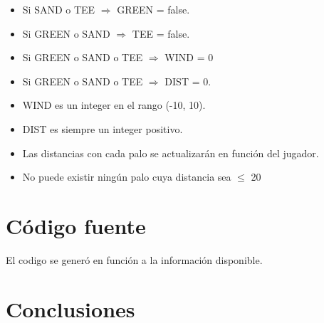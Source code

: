 \documentclass[runningheads,a4paper]{llncs}
\begin{document}
\begin{itemize}

	\item Si SAND o TEE $\Rightarrow$ GREEN = false.

	\item Si GREEN o SAND $\Rightarrow$ TEE = false.

	\item Si GREEN o SAND o TEE $\Rightarrow$ WIND = 0 

	\item Si GREEN o SAND o TEE $\Rightarrow$ DIST = 0.

	\item WIND es un integer en el rango (-10, 10).

	\item DIST es siempre un integer positivo.

  \item Las distancias con cada palo se actualizarán en función del jugador.

  \item No puede existir ningún palo cuya distancia sea $\leq$ 20

\end{itemize}

\section{Código fuente}

  El codigo se generó en función a la información disponible.\cite{source}\\






\section{Conclusiones}
\end{document}
